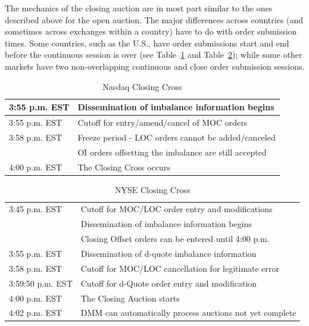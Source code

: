 The mechanics of the closing auction are in most part similar to the ones described above for the open auction. The major differences across countries (and sometimes across exchanges within a country) have to do with order submission times. Some countries, such as the U.S., have order submissions start and end before the continuous session is over (see Table~\ref{tab:NASDAQclose} and Table~\ref{tab:NYSEclose}); while some other markets have two non-overlapping continuous and close order submission sessions.

\begin{table}[!ht]
   \centering
   \caption{Nasdaq Closing Cross\label{tab:NASDAQclose}}
   \begin{tabular}{ll} 
	3:55 p.m. EST & Dissemination of imbalance information begins  \\ \hline
	3:55 p.m. EST & Cutoff for entry/amend/cancel of MOC orders\\ \hline
	3:58 p.m. EST & Freeze period - LOC orders cannot be added/canceled  \\ 
	 & OI orders offsetting the imbalance are still accepted   \\ \hline	
	4:00 p.m. EST & The Closing Cross occurs		
   \end{tabular}
\end{table}	

\begin{table}[!ht]
   \centering
   \caption{NYSE Closing Cross\label{tab:NYSEclose}}
   \begin{tabular}{ll} 
	3:45 p.m. EST & Cutoff for MOC/LOC order entry and modifications  \\ 
     & Dissemination of imbalance information begins \\
	 & Closing Offset orders can be entered until 4:00 p.m.  \\ \hline	 
	3:55 p.m. EST &  Dissemination of d-quote imbalance information\\ \hline
	3:58 p.m. EST & Cutoff for MOC/LOC cancellation for legitimate error \\ \hline
	3:59:50 p.m. EST & Cutoff for d-Quote order entry and modification \\ \hline
	4:00 p.m. EST & The Closing Auction starts \\ \hline
	4:02 p.m. EST & DMM can automatically process auctions not yet complete
   \end{tabular}
\end{table}	


